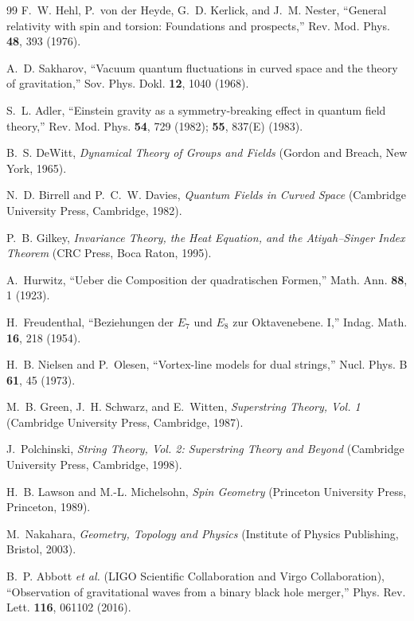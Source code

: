 \documentclass[aps,prd,preprint,longbibliography,nofootinbib,superscriptaddress,floatfix]{revtex4-2}
\begin{document}
\begin{thebibliography}{99}
F.~W. Hehl, P.~von der Heyde, G.~D. Kerlick, and J.~M. Nester,
``General relativity with spin and torsion: Foundations and prospects,''
Rev. Mod. Phys. \textbf{48}, 393 (1976).

A.~D. Sakharov,
``Vacuum quantum fluctuations in curved space and the theory of gravitation,''
Sov. Phys. Dokl. \textbf{12}, 1040 (1968).

S.~L. Adler,
``Einstein gravity as a symmetry-breaking effect in quantum field theory,''
Rev. Mod. Phys. \textbf{54}, 729 (1982); \textbf{55}, 837(E) (1983).

B.~S. DeWitt,
\textit{Dynamical Theory of Groups and Fields}
(Gordon and Breach, New York, 1965).

N.~D. Birrell and P.~C.~W. Davies,
\textit{Quantum Fields in Curved Space}
(Cambridge University Press, Cambridge, 1982).

P.~B. Gilkey,
\textit{Invariance Theory, the Heat Equation, and the Atiyah--Singer Index Theorem}
(CRC Press, Boca Raton, 1995).

A.~Hurwitz,
``Ueber die Composition der quadratischen Formen,''
Math. Ann. \textbf{88}, 1 (1923).

H.~Freudenthal,
``Beziehungen der \(E_7\) und \(E_8\) zur Oktavenebene. I,''
Indag. Math. \textbf{16}, 218 (1954).

H.~B. Nielsen and P.~Olesen,
``Vortex-line models for dual strings,''
Nucl. Phys. B \textbf{61}, 45 (1973).

M.~B. Green, J.~H. Schwarz, and E.~Witten,
\textit{Superstring Theory, Vol. 1}
(Cambridge University Press, Cambridge, 1987).

J.~Polchinski,
\textit{String Theory, Vol. 2: Superstring Theory and Beyond}
(Cambridge University Press, Cambridge, 1998).

H.~B. Lawson and M.-L. Michelsohn,
\textit{Spin Geometry}
(Princeton University Press, Princeton, 1989).

M.~Nakahara,
\textit{Geometry, Topology and Physics}
(Institute of Physics Publishing, Bristol, 2003).

B.~P. Abbott \textit{et al.} (LIGO Scientific Collaboration and Virgo Collaboration),
``Observation of gravitational waves from a binary black hole merger,''
Phys. Rev. Lett. \textbf{116}, 061102 (2016).


\end{thebibliography}
\end{document}
